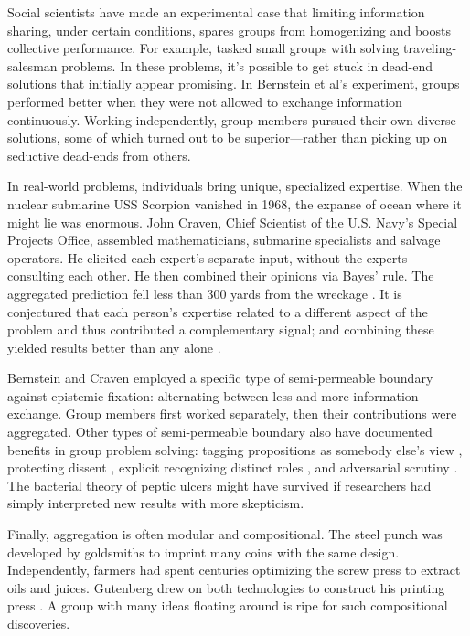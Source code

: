 \documentclass[11pt]{article}
\begin{document}
Social scientists have made an experimental case that limiting information sharing, under certain conditions, spares groups from homogenizing and boosts collective performance. For example, \cite{bernstein2018intermittent} tasked small groups with solving traveling-salesman problems. In these problems, it's possible to get stuck in dead-end solutions that initially appear promising. In Bernstein et al's experiment, groups performed better when they were not allowed to exchange information continuously. Working independently, group members pursued their own diverse solutions, some of which turned out to be superior---rather than picking up on seductive dead-ends from others.

In real-world problems, individuals bring unique, specialized expertise. When the nuclear submarine USS Scorpion vanished in 1968, the expanse of ocean where it might lie was enormous. John Craven, Chief Scientist of the U.S. Navy's Special Projects Office, assembled mathematicians, submarine specialists and salvage operators. He elicited each expert's separate input, without the experts consulting each other. He then combined their opinions via Bayes' rule. The aggregated prediction fell less than 300 yards from the wreckage \citep{richardson1971operations, sontag1998blind}. It is conjectured that each person's expertise related to a different aspect of the problem and thus contributed a complementary signal; and combining these yielded results better than any alone \citep{surowiecki2005wisdom}.

Bernstein and Craven employed a specific type of semi-permeable boundary against epistemic fixation: alternating between less and more information exchange. Group members first worked separately, then their contributions were aggregated. Other types of semi-permeable boundary also have documented benefits in group problem solving: tagging propositions as somebody else's view \citep{johnson1993source}, protecting dissent \citep{sunstein2015wiser}, explicit recognizing distinct roles \citep{hutchins1995cognition}, and adversarial scrutiny \citep{longino1990science}. The bacterial theory of peptic ulcers might have survived if researchers had simply interpreted new results with more skepticism.

Finally, aggregation is often modular and compositional. The steel punch was developed by goldsmiths to imprint many coins with the same design. Independently, farmers had spent centuries optimizing the screw press to extract oils and juices. Gutenberg drew on both technologies to construct his printing press \citep{johnson2010where}. A group with many ideas floating around is ripe for such compositional discoveries.
\end{document}
